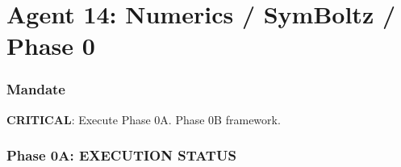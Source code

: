 \documentclass[11pt,a4paper]{article}
\begin{document}
\part{Agent 14: Numerics / SymBoltz / Phase 0}
\label{part:agent14}

\section{Mandate}

\textbf{CRITICAL}: Execute Phase 0A. Phase 0B framework.

\section{Phase 0A: EXECUTION STATUS}
\end{document}
